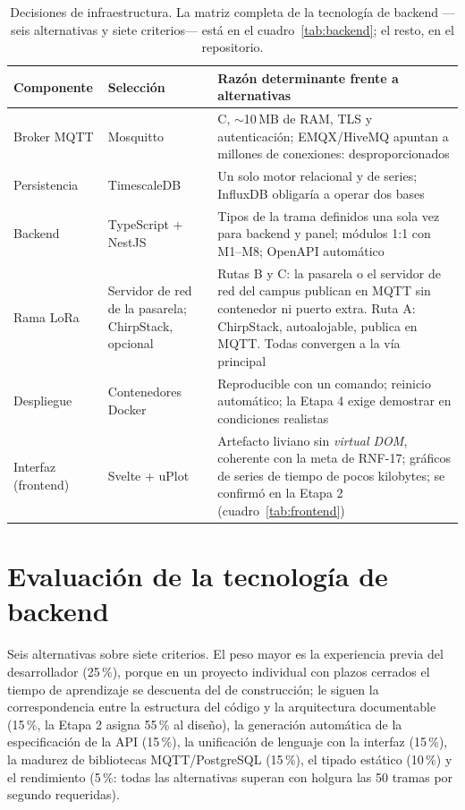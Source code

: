 \begin{table}[H]
\centering\footnotesize
\begin{tablaseg}
\begin{tabular}{@{}L{2.4cm}L{2.4cm}L{7.6cm}@{}}
\toprule
\textbf{Componente} & \textbf{Selección} & \textbf{Razón determinante frente a alternativas} \\
\midrule
Broker MQTT & Mosquitto & C, $\sim$10\,MB de RAM, TLS y autenticación; EMQX/HiveMQ apuntan a millones de conexiones: desproporcionados \\
Persistencia & TimescaleDB & Un solo motor relacional y de series; InfluxDB obligaría a operar dos bases \\
Backend & TypeScript + NestJS & Tipos de la trama definidos una sola vez para backend y panel; módulos 1:1 con M1--M8; OpenAPI automático \\
Rama LoRa & Servidor de red de la pasarela; ChirpStack, opcional & Rutas B y C: la pasarela o el servidor de red del campus publican en MQTT sin contenedor ni puerto extra. Ruta A: ChirpStack, autoalojable, publica en MQTT. Todas convergen a la vía principal \\
Despliegue & Contenedores Docker & Reproducible con un comando; reinicio automático; la Etapa 4 exige demostrar en condiciones realistas \\
Interfaz (frontend) & Svelte + uPlot & Artefacto liviano sin \emph{virtual DOM}, coherente con la meta de RNF-17; gráficos de series de tiempo de pocos kilobytes; se confirmó en la Etapa 2 (cuadro~\ref{tab:frontend}) \\
\bottomrule
\end{tabular}
\end{tablaseg}
\caption{Decisiones de infraestructura. La matriz completa de la tecnología de backend —seis alternativas y siete criterios— está en el cuadro~\ref{tab:backend}; el resto, en el repositorio.}
\label{tab:infra}
\end{table}

\section{Evaluación de la tecnología de backend}

Seis alternativas sobre siete criterios. El peso mayor es la experiencia previa del desarrollador
(25\,\%), porque en un proyecto individual con plazos cerrados el tiempo de aprendizaje se descuenta
del de construcción; le siguen la correspondencia entre la estructura del código y la arquitectura
documentable (15\,\%, la Etapa 2 asigna 55\,\% al diseño), la generación automática de la
especificación de la API (15\,\%), la unificación de lenguaje con la interfaz (15\,\%), la madurez de
bibliotecas MQTT/PostgreSQL (15\,\%), el tipado estático (10\,\%) y el rendimiento (5\,\%: todas las
alternativas superan con holgura las 50 tramas por segundo requeridas).

